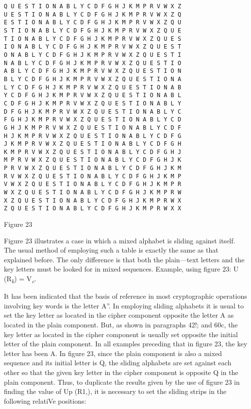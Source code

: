 \begin{textfigure}
        \begin{verbatim}
Q U E S T I O N A B L Y C D F G H J K M P R V W X Z
U E S T I O N A B L Y C D F G H J K M P R V W X Z Q
E S T I O N A B L Y C D F G H J K M P R V W X Z Q U
S T I O N A B L Y C D F G H J K M P R V W X Z Q U E
T I O N A B L Y C D F G H J K M P R V W X Z Q U E S
I O N A B L Y C D F G H J K M P R V W X Z Q U E S T
O N A B L Y C D F G H J K M P R V W X Z Q U E S T I
N A B L Y C D F G H J K M P R V W X Z Q U E S T I O
A B L Y C D F G H J K M P R V W X Z Q U E S T I O N
B L Y C D F G H J K M P R V W X Z Q U E S T I O N A
L Y C D F G H J K M P R V W X Z Q U E S T I O N A B
Y C D F G H J K M P R V W X Z Q U E S T I O N A B L
C D F G H J K M P R V W X Z Q U E S T I O N A B L Y
D F G H J K M P R V W X Z Q U E S T I O N A B L Y C
F G H J K M P R V W X Z Q U E S T I O N A B L Y C D
G H J K M P R V W X Z Q U E S T I O N A B L Y C D F
H J K M P R V W X Z Q U E S T I O N A B L Y C D F G
J K M P R V W X Z Q U E S T I O N A B L Y C D F G H
K M P R V W X Z Q U E S T I O N A B L Y C D F G H J
M P R V W X Z Q U E S T I O N A B L Y C D F G H J K
P R V W X Z Q U E S T I O N A B L Y C D F G H J K M
R V W X Z Q U E S T I O N A B L Y C D F G H J K M P
V W X Z Q U E S T I O N A B L Y C D F G H J K M P R
W X Z Q U E S T I O N A B L Y C D F G H J K M P R W
X Z Q U E S T I O N A B L Y C D F G H J K M P R W X
Z Q U E S T I O N A B L Y C D F G H J K M P R W X X
        \end{verbatim}
        \caption{Figure 23}
\end{textfigure}

\mypara Figure 23 illustrates a case in which a mixed alphabet is sliding
against itself. The usual method of employing such a table is exactly
the same as that explained before. The only difference is that both the
plain—text letters and the key letters must be looked for in mixed
sequences. Example, using figure 23: U\textsubscript{} (R\textsubscript{\textit{k}}) = V\textsubscript{\textit{c}}.

\mypara It has been indicated that the basis of reference in most cryptographic operations involving key words is the letter A”. In employing
sliding alphabets it is usual to set the key letter as located in the cipher
component opposite the letter A as located in the plain component. But,
as shown in paragraphs 42!; and 60c, the key letter as located in the
cipher component is usually set opposite the initial letter of the plain
component. In all examples preceding that in ﬁgure 23, the key letter has
been A. In ﬁgure 23, since the plain component is also a mixed sequence
and its initial letter is Q, the sliding alphabets are set against each other
so that the given key letter in the cipher component is opposite Q in the
plain component. Thus, to duplicate the results given by the use of ﬁgure
23 in ﬁnding the value of Up (R1,), it is necessary to set the sliding strips
in the following relatiVe positions:

